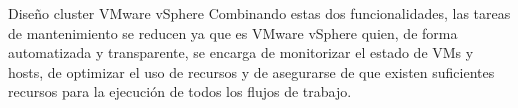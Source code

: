 \begin{subsubsection}{Diseño cluster VMware vSphere}
Combinando estas dos funcionalidades, las tareas de mantenimiento se reducen ya que es VMware vSphere quien, de forma automatizada y transparente, se encarga de monitorizar el estado de VMs y hosts, de optimizar el uso de recursos y de asegurarse de que existen suficientes recursos para la ejecución de todos los flujos de trabajo.



\end{subsubsection}
